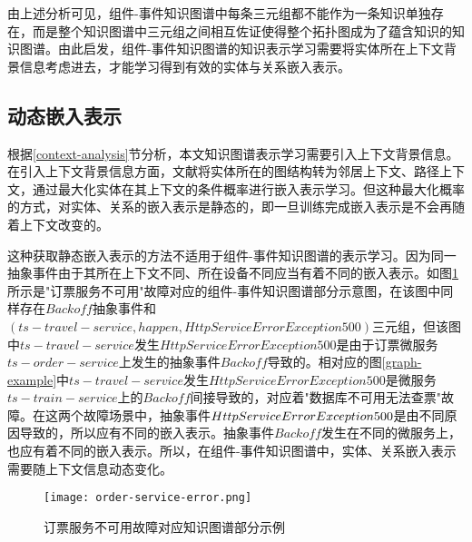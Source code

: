 由上述分析可见，组件-事件知识图谱中每条三元组都不能作为一条知识单独存在，而是整个知识图谱中三元组之间相互佐证使得整个拓扑图成为了蕴含知识的知识图谱。由此启发，组件-事件知识图谱的知识表示学习需要将实体所在上下文背景信息考虑进去，才能学习得到有效的实体与关系嵌入表示。
\subsection{动态嵌入表示}
根据\ref{context-analysis}节分析，本文知识图谱表示学习需要引入上下文背景信息。在引入上下文背景信息方面，文献\parencite{feng2016gake,shi2017knowledge}将实体所在的图结构转为邻居上下文、路径上下文，通过最大化实体在其上下文的条件概率进行嵌入表示学习。但这种最大化概率的方式，对实体、关系的嵌入表示是静态的，即一旦训练完成嵌入表示是不会再随着上下文改变的。

这种获取静态嵌入表示的方法不适用于组件-事件知识图谱的表示学习。因为同一抽象事件由于其所在上下文不同、所在设备不同应当有着不同的嵌入表示。如图\ref{order-service-error}所示是"订票服务不可用"故障对应的组件-事件知识图谱部分示意图，在该图中同样存在$Backoff$抽象事件和$\left(ts-travel-service, happen, HttpServiceError Exception 500\right)$三元组，但该图中$ts-travel-service$发生$HttpServiceError Exception 500$是由于订票微服务$ts-order-service$上发生的抽象事件$Backoff$导致的。相对应的图\ref{graph-example}中$ts-travel-service$发生$HttpServiceError Exception 500$是微服务$ts-train-service$上的$Backoff$间接导致的，对应着"数据库不可用无法查票"故障。在这两个故障场景中，抽象事件$HttpServiceError Exception \\500$是由不同原因导致的，所以应有不同的嵌入表示。抽象事件$Backoff$发生在不同的微服务上，也应有着不同的嵌入表示。所以，在组件-事件知识图谱中，实体、关系嵌入表示需要随上下文信息动态变化。
\begin{figure}[htbp]
    \centering
    \texttt{[image: order-service-error.png]}
    \caption{订票服务不可用故障对应知识图谱部分示例\label{order-service-error}}
\end{figure}

